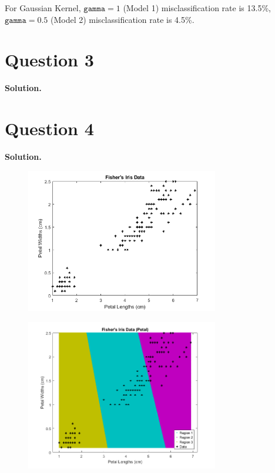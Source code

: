 \documentclass[11pt]{article}
\begin{document}
For Gaussian Kernel, \(\texttt{gamma}=1\) (Model 1) misclassification rate is 13.5\%, \(\texttt{gamma}=0.5\) (Model 2) misclassification rate is 4.5\%.












\clearpage
\section*{Question 3}

\textbf{Solution.}





\clearpage
\section*{Question 4}

\textbf{Solution.}





\begin{figure}[!h]
  \centering
  \includegraphics[width=0.75\textwidth]{../q4/fisheriris_unclustered.png}
  \label{fig:fishunclust}
\end{figure}


\begin{figure}[!h]
  \centering
  \includegraphics[width=0.75\textwidth]{../q4/fisheriris_clustered.png}
  \label{fig:fishclust}
\end{figure}
\end{document}
